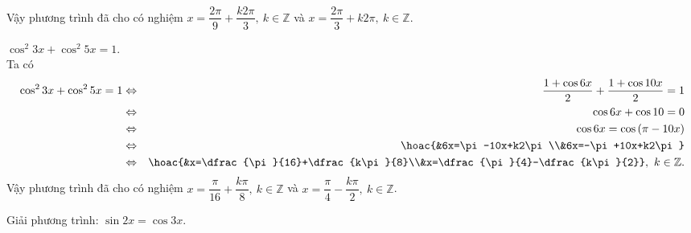\begin{bt}
{\begin{listEX}[1]
\begin{eqnarray*}
			\end{eqnarray*}
			Vậy phương trình đã cho có nghiệm $x=\dfrac{2\pi}{9}+\dfrac{k2\pi}{3}, \ k \in \mathbb{Z} $ và $x=\dfrac{2\pi}{3}+k2\pi, \ k \in \mathbb{Z}$.
			\item $\cos^2 3x+\cos^2 5x =1$.\\
			Ta có 
			\begin{eqnarray*}
				\cos^2 3x+\cos^2 5x =1 &\Leftrightarrow& \dfrac{1+\cos 6x}{2}+\dfrac{1+\cos 10x}{2}=1\\
				&\Leftrightarrow& \cos 6x +\cos 10=0\\
				&\Leftrightarrow& \cos 6x = \cos \left(\pi -10x\right)\\
				&\Leftrightarrow& \hoac{&6x=\pi-10x+k2\pi\\&6x=-\pi+10x+k2\pi}\\
				&\Leftrightarrow&\hoac{&x=\dfrac{\pi}{16}+\dfrac{k\pi}{8}\\&x=\dfrac{\pi}{4}-\dfrac{k\pi}{2}}, \ k \in \mathbb{Z}.
			\end{eqnarray*}
			Vậy phương trình đã cho có nghiệm $x=\dfrac{\pi}{16}+\dfrac{k\pi}{8},\ k \in \mathbb{Z}$ và $ x=\dfrac{\pi}{4}-\dfrac{k\pi}{2}, \ k \in \mathbb{Z}$.
		\end{listEX}
	}
\end{bt}

\begin{bt}%
	Giải phương trình:  $\sin 2x=\cos 3x$.
\end{bt}

